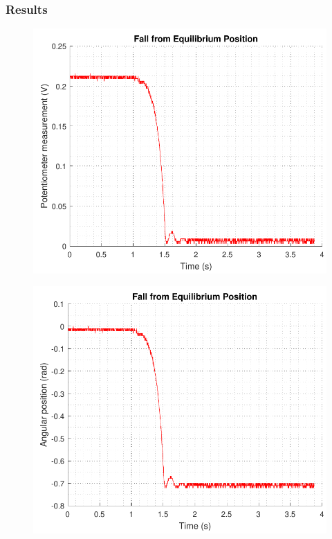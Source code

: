 \subsubsection{Results}
\begin{minipage}{\linewidth}
	\begin{minipage}{0.45\linewidth}
		\begin{figure}[H]
			\includegraphics[scale=.53]{figures/FallVolt}
			\centering
			\vspace{-.4cm}
			\captionsetup{justification=centering}
			\label{FallVolt}
		\end{figure}\vspace{-5mm}
	\end{minipage}
	\hspace{0.03\linewidth}
	\begin{minipage}{0.45\linewidth}
		\begin{figure}[H]
			\includegraphics[scale=.53]{figures/FallRad}

\end{figure}
\end{minipage}
\end{minipage}
